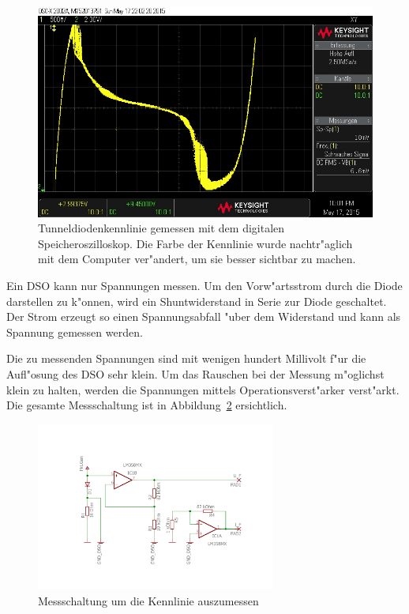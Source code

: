 \begin{refsection}
\begin{figure}	%
\centering
\includegraphics[width=\hsize]{tunneldiode/images/Kennlinie_DSO.jpg}
\caption{Tunneldiodenkennlinie gemessen mit dem digitalen Speicheroszilloskop. Die Farbe der Kennlinie wurde nachtr"aglich mit dem Computer ver"andert, um sie besser sichtbar zu machen.
\label{tunnel:KennlinieDSO}}
\end{figure}

Ein DSO kann nur Spannungen messen. 
Um den Vorw"artsstrom durch die Diode darstellen zu k"onnen, wird ein Shuntwiderstand in Serie zur Diode geschaltet. 
Der Strom erzeugt so einen Spannungsabfall "uber dem Widerstand und kann als Spannung gemessen werden.

Die zu messenden Spannungen sind mit wenigen hundert Millivolt f"ur die Aufl"osung des DSO sehr klein. 
Um das Rauschen bei der Messung m"oglichst klein zu halten, werden die Spannungen mittels Operationsverst"arker verst"arkt. 
Die gesamte Messschaltung ist in Abbildung~\ref{tunnel:Messschaltung} ersichtlich.

\begin{figure}	%
\centering
\includegraphics[width=0.7\textwidth]{tunneldiode/images/Messschaltung.pdf}
\caption{Messschaltung um die Kennlinie auszumessen
\label{tunnel:Messschaltung}}
\end{figure}


\end{refsection}
